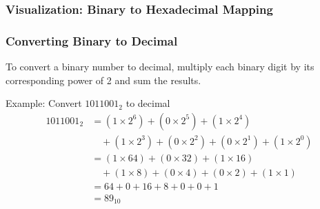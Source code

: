 \documentclass{beamer}
\begin{document}
\begin{frame}
\frametitle{Visualization: Binary to Hexadecimal Mapping}
\begin{center}
\end{center}
\end{frame}

\begin{frame}
\frametitle{Converting Binary to Decimal}
To convert a binary number to decimal, multiply each binary digit by its corresponding power of 2 and sum the results.

\begin{exampleblock}{Example: Convert $1011001_2$ to decimal}
\begin{align*}
1011001_2 &= (1 \times 2^6) + (0 \times 2^5) + (1 \times 2^4) \\
&\quad + (1 \times 2^3) + (0 \times 2^2) + (0 \times 2^1) + (1 \times 2^0) \\
&= (1 \times 64) + (0 \times 32) + (1 \times 16) \\
&\quad + (1 \times 8) + (0 \times 4) + (0 \times 2) + (1 \times 1) \\
&= 64 + 0 + 16 + 8 + 0 + 0 + 1 \\
&= 89_{10}
\end{align*}
\end{exampleblock}
\end{frame}
\end{document}

